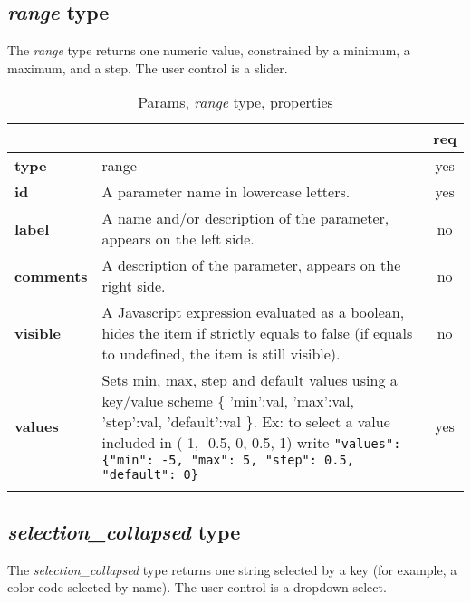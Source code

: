 \subsection{ \emph{range} type}

The \emph{range} type returns one numeric value, constrained 
by a minimum, a maximum, and a step. The user control is a slider.


\begin{longtable}{|>{\bf}L{\linewidth}|L{\linewidth}|c|}
\hline
      &  & {\bf req} 
\tabularnewline \hline \hline
 type   & range       & yes \\ \hline
 id     & A parameter name in lowercase letters. & yes \\ \hline
 label  & A name and/or description of the parameter, appears on the left side. & no
                      \\ \hline
 comments & A description of the parameter, appears on the right side. & no
                      \\ \hline
 visible    & A Javascript expression evaluated as a boolean, hides the item if
              strictly equals to false (if equals to undefined, the item is still visible). 
            & no \\ \hline
 values & Sets min, max, step and default values using a key/value 
scheme \{ 'min':val, 'max':val, 'step':val, 'default':val \}. 
Ex: to select a value included in (-1, -0.5, 0, 0.5, 1) write \texttt{"values": \{"min": -5, "max": 5, "step": 0.5, "default": 0\}}  & yes
                      \\ \hline
\caption{Params, \emph{range} type, properties}
\end{longtable}


\subsection{ \emph{selection\_collapsed} type}

The \emph{selection\_collapsed} type returns one string selected by a key (for example, 
a color code selected by name). The user control is a dropdown select.

